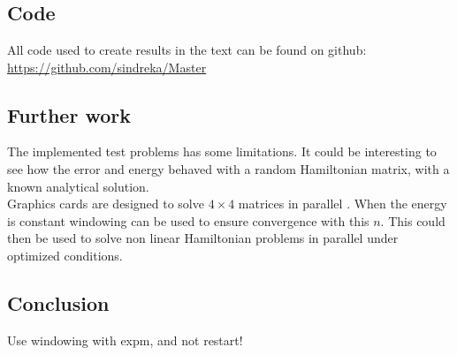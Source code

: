 \chapter{  }
\section{Code}
All code used to create results in the text can be found on github: \\
\url{https://github.com/sindreka/Master}
\section{Further work}
The implemented test problems has some limitations. It could be interesting to see how the error and energy behaved with a random Hamiltonian matrix, with a known analytical solution. \\

Graphics cards are designed to solve $4 \times 4$ matrices in parallel \cite{!!!!!!!}. When the energy is constant windowing can be used to ensure convergence with this $n$. This could then be used to solve non linear Hamiltonian problems in parallel under optimized conditions. \\



\section{Conclusion}
Use windowing with expm, and not restart!